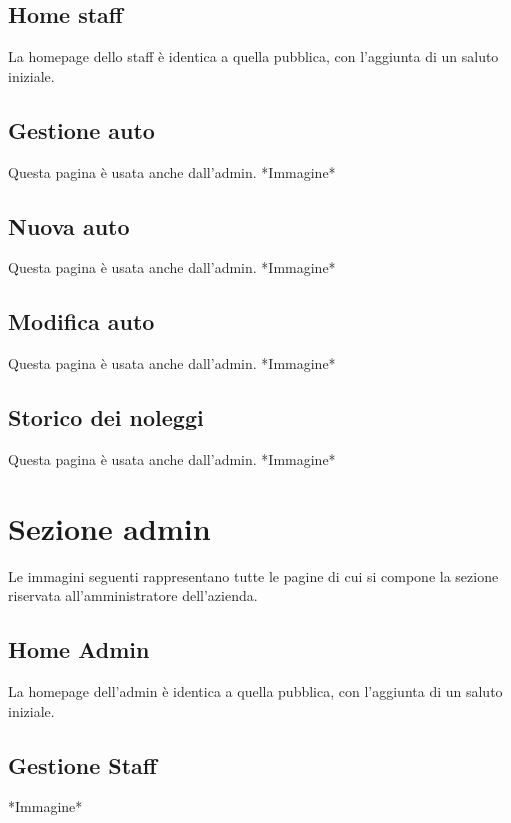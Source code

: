 \documentclass[12pt,a4paperS]{report}
\begin{document}
\begin{normalsize}
			\subsection{Home staff}
				La homepage dello staff è identica a quella pubblica, con l'aggiunta di un saluto iniziale.
			
			\subsection{Gestione auto}
				Questa pagina è usata anche dall'admin.
				\newline
				*Immagine*
			
			\subsection{Nuova auto}
				Questa pagina è usata anche dall'admin.
				\newline
				*Immagine*
			
			\subsection{Modifica auto}
				Questa pagina è usata anche dall'admin.
				\newline
				*Immagine*
			
			\subsection{Storico dei noleggi}
				Questa pagina è usata anche dall'admin.
				\newline
				*Immagine*
				
		\section{Sezione admin}
			Le immagini seguenti rappresentano tutte le pagine di cui si compone la sezione riservata all'amministratore dell'azienda.
			
			\subsection{Home Admin}
				La homepage dell'admin è identica a quella pubblica, con l'aggiunta di un saluto iniziale.
			
			\subsection{Gestione Staff}
				*Immagine*
			

\end{normalsize}
\end{document}
